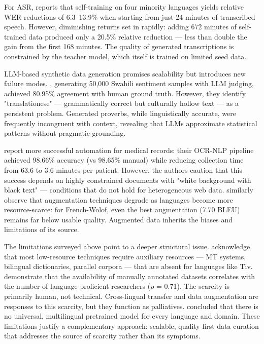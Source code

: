 \documentclass[12pt]{ThesisRU}
\begin{document}
For ASR, \citet{bartelds2023making} reports that self-training on four minority languages yields relative WER reductions of 6.3–13.9\% when starting from just 24 minutes of transcribed speech. However, diminishing returns set in rapidly: adding 672 minutes of self-trained data produced only a 20.5\% relative reduction — less than double the gain from the first 168 minutes. The quality of generated transcriptions is constrained by the teacher model, which itself is trained on limited seed data.

LLM-based synthetic data generation promises scalability but introduces new failure modes. \citet{gyamfi2026synthetic}, generating 50,000 Swahili sentiment samples with LLM judging, achieved 80.95\% agreement with human ground truth. However, they identify "translationese" — grammatically correct but culturally hollow text — as a persistent problem. Generated proverbs, while linguistically accurate, were frequently incongruent with context, revealing that LLMs approximate statistical patterns without pragmatic grounding.

\citet{Zhou2024} report more successful automation for medical records: their OCR-NLP pipeline achieved 98.66\% accuracy (vs 98.65\% manual) while reducing collection time from 63.6 to 3.6 minutes per patient. However, the authors caution that this success depends on highly constrained documents with "white background with black text" — conditions that do not hold for heterogeneous web data.\citet{oduwole2025scarcity} similarly observe that augmentation techniques degrade as languages become more resource-scarce: for French-Wolof, even the best augmentation (7.70 BLEU) remains far below usable quality. Augmented data inherits the biases and limitations of its source.

The limitations surveyed above point to a deeper structural issue. \citet{hedderich2021survey} acknowledge that most low-resource techniques require auxiliary resources — MT systems, bilingual dictionaries, parallel corpora — that are absent for languages like Tiv. \citet{yu2022beyond} demonstrate that the availability of manually annotated datasets correlates with the number of language-proficient researchers ($\rho$ = 0.71). The scarcity is primarily human, not technical. Cross-lingual transfer and data augmentation are responses to this scarcity, but they function as palliatives. \citet{garcia2025cross} concluded that there is no universal, multilingual pretrained model for every language and domain. These limitations justify a complementary approach: scalable, quality-first data curation that addresses the source of scarcity rather than its symptoms.
\end{document}
